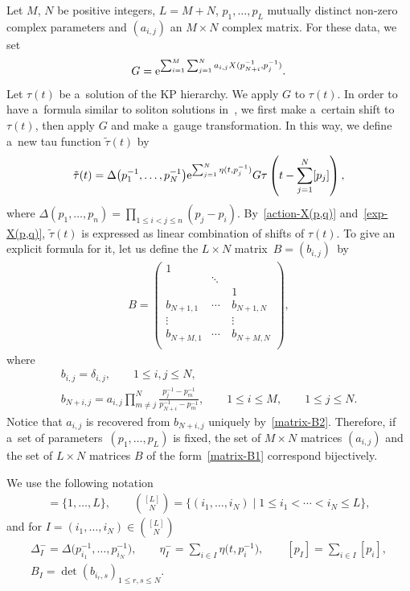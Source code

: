 \documentclass[10pt,a4paper]{amsart}
\numberwithin{equation}{section}
\theoremstyle{definition}
\begin{document}
Let $M$, $N$ be positive integers, $L=M+N$,
$p_1,\dots ,p_L$ mutually distinct non-zero complex parameters and
$(a_{i,j})$ an $M\times N$ complex matrix. For these data, we set
\begin{gather}
G={\rm e}^{\sum_{i=1}^M\sum_{j=1}^N a_{i,j} X(p_{N+i}^{-1},p_j^{-1})}.
\label{VO-G}
\end{gather}
Let $\tau(t)$ be a~solution of the KP hierarchy. We apply $G$ to $\tau(t)$.
In order to have a~formula similar to soliton solutions in~\cite{Kodama2017},
we first make a~certain shift to $\tau(t)$, then apply $G$ and make a~gauge transformation.
In this way, we define a~new tau function $\tilde{\tau}(t)$ by
\begin{gather}
\tilde{\tau}(t)=\Delta\bigl(p_1^{-1},\dots ,p_N^{-1}\bigr){\rm e}^{\sum_{j=1}^N\eta(t,p_j^{-1})}
G \tau\left(t-\sum_{j=1}^N[p_j]\right),
\label{tau-VO}
\end{gather}
where
$
\Delta(p_1,\dots ,p_n)=\prod_{1\leq i<j\leq n}(p_j-p_i)$.
By~\eqref{action-X(p,q)} and~\eqref{exp-X(p,q)}, $\tilde{\tau}(t)$ is expressed as
linear combination of shifts of $\tau(t)$.
To give an explicit formula for it, let us define the $L\times N$ matrix~${B=(b_{i,j})}$~by
\begin{gather}
 B=\left(
 \begin{matrix}
 1&\quad&\quad\\
 \quad&\ddots&\quad\\
 \quad&\quad&1\\
 b_{N+1,1}&\cdots&b_{N+1,N}\\
 \vdots&\quad&\vdots\\
 b_{N+M,1}&\cdots&b_{N+M,N}\\
 \end{matrix}
 \right),
 \label{matrix-B1}
 \end{gather}
 where
\begin{gather}
b_{i,j}=\delta_{i,j}, \qquad 1\leq i, j\leq N,
\nonumber
\\
b_{N+i,j}=a_{i,j}\prod_{m\neq j}^N\frac{p_j^{-1}-p_m^{-1}}{p_{N+i}^{-1}-p_m^{-1}},
 \qquad 1\leq i\leq M,\qquad 1\leq j\leq N.
\label{matrix-B2}
\end{gather}
Notice that $a_{i,j}$ is recovered from $b_{N+i,j}$ uniquely by~\eqref{matrix-B2}.
Therefore, if a~set of parameters~${(p_1,\dots ,p_L)}$ is fixed, the set of $M\times N$
matrices $(a_{i,j})$ and the set of $L\times N$ matrices $B$ of the form~\eqref{matrix-B1}
 correspond bijectively.

We use the following notation
\begin{gather*}
[L]=\{1,\dots ,L\},
\qquad
\binom{[L]}{N}=\{(i_1,\dots ,i_N) \mid 1\leq i_1<\cdots<i_N\leq L\},
\end{gather*}
and for $I=(i_1,\dots ,i_N)\in \binom{[L]}{N}$
\begin{gather*}
\Delta^{-}_I=\Delta\bigl(p_{i_1}^{-1},\dots ,p_{i_N}^{-1}\bigr),
\qquad
\eta_I^{-}=\sum_{i\in I} \eta\bigl(t,p_i^{-1}\bigr),
\qquad
[p_I]=\sum_{i\in I} [p_i],
\\
B_I=\det(b_{i_r,s})_{1\leq r,s\leq N}.
\end{gather*}
\end{document}
